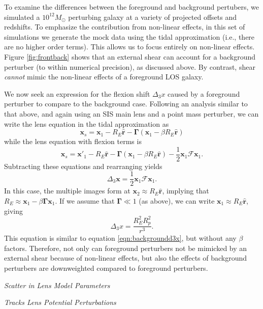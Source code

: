 \documentclass{emulateapj}
\newcommand\GammaMat[0]{\boldsymbol{\Gamma}}
\newcommand\x[0]{\mathbf{x}}
\renewcommand\vec[1]{\mathbf{#1}}
\newcommand\rhat[0]{\vec{\hat{r}}}
\newcommand\sF{{\mathcal F}}
\begin{document}
To examine the differences between the foreground and background pertubers, we simulated a $10^{12} M_\odot$ perturbing galaxy at a variety of projected offsets and redshifts. To emphasize the contribution from non-linear effects, in this set of simulations we generate the mock data using the tidal approximation (i.e., there are no higher order terms). This allows us to focus entirely on non-linear effects.  Figure \ref{fig:frontback} shows that an external shear can account for a background perturber (to within numerical precision), as discussed above.  By contrast, shear \emph{cannot} mimic the non-linear effects of a foreground LOS galaxy.  

We now seek an expression for the flexion shift $\Delta_3 x$ caused by a foreground perturber to compare to the background case.  Following an analysis similar to that above, and again using an SIS main lens and a point mass perturber, we can write the lens equation in the tidal approximation as
\begin{equation}
\x_s = \x_1 - R_E \rhat - \GammaMat(\x_1 - \beta R_E \rhat) 
\end{equation}
while the lens equation with flexion terms is
\begin{equation}
\x_s = \x'_1 - R_E \rhat - \GammaMat(\x_1 - \beta R_E \rhat) - \frac{1}{2} \x_1 \sF \x_1.
\end{equation}
Subtracting these equations and rearranging yields
\begin{equation}
\Delta_3 \x = \frac{1}{2} \x_1 \sF \x_1.
\end{equation}
In this case, the multiple images form at $\x_2 \approx R_E \rhat$, implying that $R_E \approx \x_1 - \beta \GammaMat \x_1$. If we assume that $\GammaMat \ll 1$ (as above), we can write $\x_1 \approx R_E \rhat$, giving
\begin{equation}
\Delta_3 x = \frac{R_E^2 R_p^2}{r^3}.
\label{eqn:foregroundd3x}
\end{equation}
This equation is similar to equation \ref{eqn:backgroundd3x}, but without any $\beta$ factors. Therefore, not only can foreground perturbers not be mimicked by an external shear because of non-linear effects, but also the effects of background perturbers are downweighted compared to foreground perturbers.

\medskip
\centerline{\emph{Scatter in Lens Model Parameters}}
\centerline{\emph{Tracks Lens Potential Perturbations}}
\medskip
\end{document}
